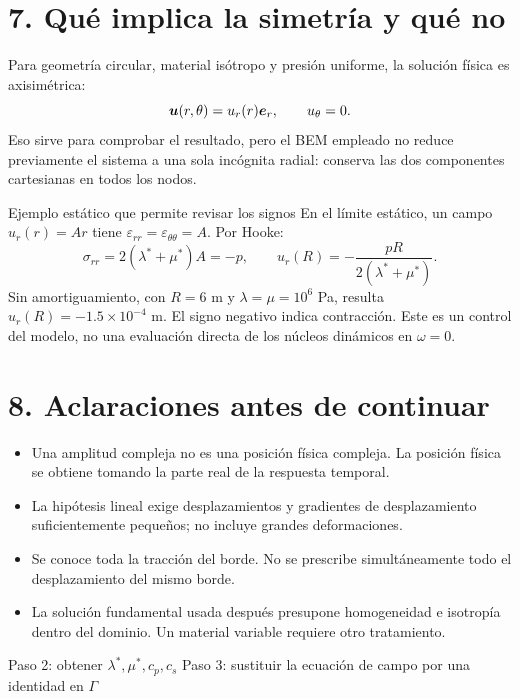 \documentclass[11pt]{article}
\begin{document}
\newpage
\section*{7. Qué implica la simetría y qué no}
Para geometría circular, material isótropo y presión uniforme, la solución
física es axisimétrica:
\[
 \bm{u}(r,\theta)=u_r(r)\bm{e}_r,\qquad u_\theta=0.
\]
Eso sirve para comprobar el resultado, pero el BEM empleado no reduce
previamente el sistema a una sola incógnita radial: conserva las dos
componentes cartesianas en todos los nodos.

\begin{resultado}{Ejemplo estático que permite revisar los signos}
En el límite estático, un campo \(u_r(r)=Ar\) tiene
\(\varepsilon_{rr}=\varepsilon_{\theta\theta}=A\). Por Hooke:
\[
 \sigma_{rr}=2(\lambda^*+\mu^*)A=-p,
 \qquad
 \boxed{u_r(R)=-\frac{pR}{2(\lambda^*+\mu^*)}.}
\]
Sin amortiguamiento, con \(R=6\) m y
\(\lambda=\mu=10^6\) Pa, resulta
\(u_r(R)=-1.5\times10^{-4}\) m. El signo negativo indica contracción.
Este es un control del modelo, no una evaluación directa de los núcleos
dinámicos en \(\omega=0\).
\end{resultado}

\section*{8. Aclaraciones antes de continuar}
\begin{itemize}
 \item Una amplitud compleja no es una posición física compleja. La
 posición física se obtiene tomando la parte real de la respuesta temporal.
 \item La hipótesis lineal exige desplazamientos y gradientes de
 desplazamiento suficientemente pequeños; no incluye grandes deformaciones.
 \item Se conoce toda la tracción del borde. No se prescribe simultáneamente
 todo el desplazamiento del mismo borde.
 \item La solución fundamental usada después presupone homogeneidad e
 isotropía dentro del dominio. Un material variable requiere otro tratamiento.
\end{itemize}

{Paso 2: obtener \(\lambda^*,\mu^*,c_p,c_s\)}
{Paso 3: sustituir la ecuación de campo por una identidad en \(\Gamma\)}
\fuentes
\end{document}
